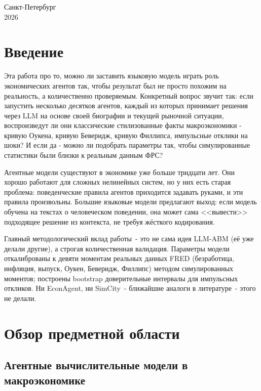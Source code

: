\documentclass[12pt, a4paper]{article}
\begin{document}
\vfil\vfil
\begin{center}
Санкт-Петербург\\
2026
\end{center}
\eject

\tableofcontents
\newpage

\sloppy

\section{Введение}

Эта работа про то, можно ли заставить языковую модель играть роль экономических агентов так, чтобы результат был не просто похожим на реальность, а количественно проверяемым. Конкретный вопрос звучит так: если запустить несколько десятков агентов, каждый из которых принимает решения через LLM на основе своей биографии и текущей рыночной ситуации, воспроизведут ли они классические стилизованные факты макроэкономики - кривую Оукена, кривую Беверидж, кривую Филлипса, импульсные отклики на шоки? И если да - можно ли подобрать параметры так, чтобы симулированные статистики были близки к реальным данным ФРС?

Агентные модели существуют в экономике уже больше тридцати лет. Они хорошо работают для сложных нелинейных систем, но у них есть старая проблема: поведенческие правила агентов приходится задавать руками, и эти правила произвольны. Большие языковые модели предлагают выход: если модель обучена на текстах о человеческом поведении, она может сама <<вывести>> подходящее решение из контекста, не требуя жёсткого кодирования.

Главный методологический вклад работы~- это не сама идея LLM-ABM (её уже делали другие), а строгая количественная валидация. Параметры модели откалиброваны к девяти моментам реальных данных FRED (безработица, инфляция, выпуск, Оукен, Беверидж, Филлипс) методом симулированных моментов; построены bootstrap доверительные интервалы для импульсных откликов. Ни EconAgent, ни SimCity~- ближайшие аналоги в литературе~- этого не делали.

\section{Обзор предметной области}

\subsection{Агентные вычислительные модели в макроэкономике}
\end{document}

